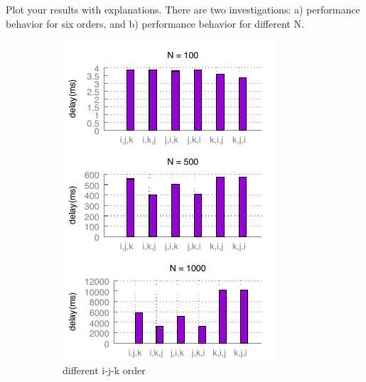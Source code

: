 \documentclass{article}
\begin{document}
Plot your results with explanations. There are two investigations: a) performance behavior for six orders, and b) performance behavior for different N.\\
    \begin{figure}[h!]
        \centering
        \begin{subfigure}[b]{0.4\linewidth}
          \includegraphics[width=\linewidth]{matrix_ijk.pdf}
          \caption{different i-j-k order}
          \label{fig:ijk}
        \end{subfigure}
        \begin{subfigure}[b]{0.4\linewidth}

\end{subfigure}
\end{figure}
\end{document}
